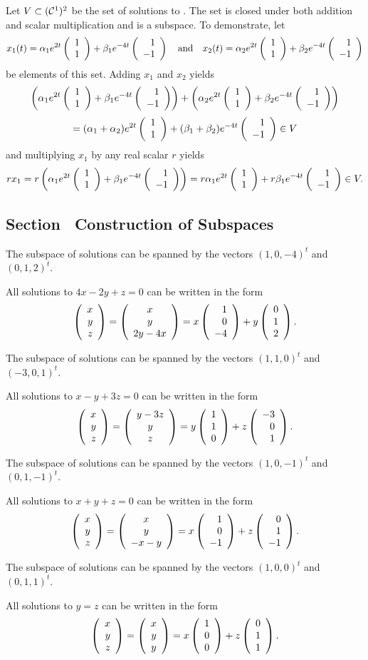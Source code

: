Let $V \subset (\CCone)^2$ be the set of solutions to .
The set is closed under both addition and scalar multiplication and
is a subspace.
To demonstrate, let
\[
x_1(t) = \alpha_1 e^{2t}\vectwo{1}{1} +
\beta_1 e^{-4t}\vectwo{1}{-1} \AND x_2(t) =
\alpha_2 e^{2t}\vectwo{1}{1} + \beta_2 e^{-4t}\vectwo{1}{-1}
\]
be elements of this set.  Adding $x_1$ and $x_2$ yields
\[
\left(\alpha_1 e^{2t}\vectwo{1}{1} +
\beta_1 e^{-4t}\vectwo{1}{-1}\right) +
\left(\alpha_2 e^{2t}\vectwo{1}{1}
+ \beta_2 e^{-4t}\vectwo{1}{-1}\right)
\]
\[
= (\alpha_1 + \alpha_2)e^{2t}\vectwo{1}{1} +
(\beta_1 + \beta_2) e^{-4t}\vectwo{1}{-1} \in V
\]
and multiplying $x_1$ by any real scalar $r$ yields
\[
rx_1 = r\left(\alpha_1 e^{2t}\vectwo{1}{1} +
\beta_1 e^{-4t}\vectwo{1}{-1}\right) = r\alpha_1 e^{2t}\vectwo{1}{1} +
r\beta_1 e^{-4t}\vectwo{1}{-1} \in V.
\]


\subsection*{Section~\protect{\ref{S:5.2}} Construction of Subspaces}

 \ans The subspace of solutions can be spanned by the vectors 
$(1,0,-4)^t$ and $(0,1,2)^t$.

\soln All solutions to $4x - 2y + z = 0$ can be written in the form
\[
\vecthree{x}{y}{z} = \cvecthree{x}{y}{2y - 4x}
= x\vecthree{1}{0}{-4} + y\vecthree{0}{1}{2}.
\]

  \ans The subspace of solutions can be spanned by the vectors 
$(1,1,0)^t$ and $(-3,0,1)^t$.

\soln All solutions to $x - y + 3z = 0$ can be written in the form
\[
\vecthree{x}{y}{z} = \cvecthree{y-3z}{y}{z}
= y\vecthree{1}{1}{0} + z\vecthree{-3}{0}{1}.
\]

  \ans The subspace of solutions can be spanned by the vectors 
$(1,0,-1)^t$ and $(0,1,-1)^t$.

\soln All solutions to $x + y + z = 0$ can be written in the form
\[
\vecthree{x}{y}{z} = \cvecthree{x}{y}{-x-y}
= x\vecthree{1}{0}{-1} + z\vecthree{0}{1}{-1}.
\]



 \ans The subspace of solutions can be spanned by the vectors 
$(1,0,0)^t$ and $(0,1,1)^t$.

\soln All solutions to $y = z$ can be written in the form
\[
\vecthree{x}{y}{z} = \cvecthree{x}{y}{y}
= x\vecthree{1}{0}{0} + z\vecthree{0}{1}{1}.
\]


